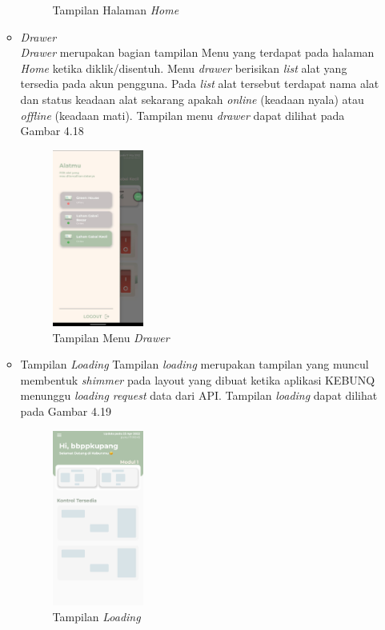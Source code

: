 \begin{flushleft}
\begin{justify}
\begin{enumerate}
\begin{itemize}
\begin{figure}[ht]
                    \caption{Tampilan Halaman \emph{Home}}
                \end{figure}
                \newline
                \item \emph{Drawer}\\
                \emph{Drawer} merupakan bagian tampilan Menu yang terdapat pada halaman \emph{Home} ketika diklik/disentuh. Menu \emph{drawer} berisikan \emph{list} alat yang tersedia pada akun pengguna. Pada \emph{list} alat tersebut terdapat nama alat dan status keadaan alat sekarang apakah \emph{online} (keadaan nyala) atau \emph{offline} (keadaan mati).
                Tampilan menu \emph{drawer} dapat dilihat pada Gambar 4.18
                \begin{figure}[ht]
                    \centering
                    \includegraphics[width=3cm]{images/bab 4/drawerr.jpeg}
                    \caption{Tampilan Menu \emph{Drawer}}
                \end{figure}
                \item Tampilan \emph{Loading}
                Tampilan \emph{loading} merupakan tampilan yang muncul membentuk \emph{shimmer} pada layout yang dibuat ketika aplikasi KEBUNQ menunggu \emph{loading request} data dari API.
                Tampilan \emph{loading} dapat dilihat pada Gambar 4.19
                \begin{figure}[ht]
                    \centering
                    \includegraphics[width=3cm]{images/bab 4/ui-loading.png}
                    \caption{Tampilan \emph{Loading}}
                \end{figure}


\end{itemize}
\end{enumerate}
\end{justify}
\end{flushleft}
